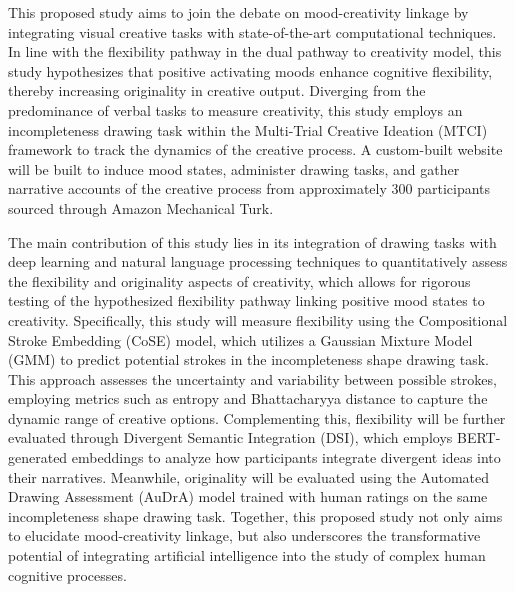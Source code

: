 \documentclass{article}
\begin{document}
This proposed study aims to join the debate on mood-creativity linkage by integrating visual creative tasks with state-of-the-art computational techniques. In line with the flexibility pathway in the dual pathway to creativity model, this study hypothesizes that positive activating moods enhance cognitive flexibility, thereby increasing originality in creative output. Diverging from the predominance of verbal tasks to measure creativity, this study employs an incompleteness drawing task within the Multi-Trial Creative Ideation (MTCI) framework to track the dynamics of the creative process. A custom-built website will be built to induce mood states, administer drawing tasks, and gather narrative accounts of the creative process from approximately 300 participants sourced through Amazon Mechanical Turk. 

The main contribution of this study lies in its integration of drawing tasks with deep learning and natural language processing techniques to quantitatively assess the flexibility and originality aspects of creativity, which allows for rigorous testing of the hypothesized flexibility pathway linking positive mood states to creativity. Specifically, this study will measure flexibility using the Compositional Stroke Embedding (CoSE) model, which utilizes a Gaussian Mixture Model (GMM) to predict potential strokes in the incompleteness shape drawing task. This approach assesses the uncertainty and variability between possible strokes, employing metrics such as entropy and Bhattacharyya distance to capture the dynamic range of creative options. Complementing this, flexibility will be further evaluated through Divergent Semantic Integration (DSI), which employs BERT-generated embeddings to analyze how participants integrate divergent ideas into their narratives. Meanwhile, originality will be evaluated using the Automated Drawing Assessment (AuDrA) model trained with human ratings on the same incompleteness shape drawing task. Together, this proposed study not only aims to elucidate mood-creativity linkage, but also underscores the transformative potential of integrating artificial intelligence into the study of complex human cognitive processes.
\end{document}

